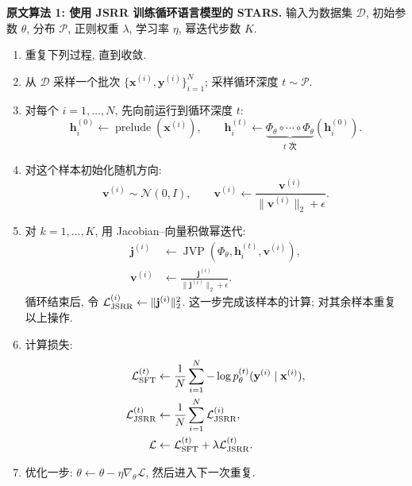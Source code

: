 \noindent\textbf{原文算法 1: 使用 JSRR 训练循环语言模型的 STARS.}\label{stars-alg-1}
输入为数据集 $\mathcal D$, 初始参数 $\theta$, 分布 $\mathcal P$, 正则权重 $\lambda$, 学习率 $\eta$, 幂迭代步数 $K$.
\begin{enumerate}
\item 重复下列过程, 直到收敛.
\item 从 $\mathcal D$ 采样一个批次 $\{\mathbf x^{(i)},\mathbf y^{(i)}\}_{i=1}^N$; 采样循环深度 $t\sim\mathcal P$.
\item 对每个 $i=1,\ldots,N$, 先向前运行到循环深度 $t$:
\[
\mathbf h_i^{(0)}\gets\operatorname{prelude}(\mathbf x^{(i)}),\qquad
\mathbf h_i^{(t)}\gets\underbrace{\Phi_\theta\circ\cdots\circ\Phi_\theta}_{t\text{ 次}}(\mathbf h_i^{(0)}).
\]
\item 对这个样本初始化随机方向:
\[
\mathbf v^{(i)}\sim\mathcal N(0,I),\qquad
\mathbf v^{(i)}\gets\frac{\mathbf v^{(i)}}{\|\mathbf v^{(i)}\|_2+\epsilon}.
\]
\item 对 $k=1,\ldots,K$, 用 Jacobian--向量积做幂迭代:
\begin{align*}
\mathbf j^{(i)}&\gets\operatorname{JVP}(\Phi_\theta,\mathbf h_i^{(t)},\mathbf v^{(i)}),\\
\mathbf v^{(i)}&\gets\frac{\mathbf j^{(i)}}{\|\mathbf j^{(i)}\|_2+\epsilon}.
\end{align*}
循环结束后, 令 $\mathcal L_{\rm JSRR}^{(i)}\gets\|\mathbf j^{(i)}\|_2^2$. 这一步完成该样本的计算; 对其余样本重复以上操作.
\item 计算损失:
\begin{align*}
\mathcal L_{\rm SFT}^{(t)}&\gets\frac1N\sum_{i=1}^N-\log p_\theta^{(t)}(\mathbf y^{(i)}\mid\mathbf x^{(i)}),\\
\mathcal L_{\rm JSRR}^{(t)}&\gets\frac1N\sum_{i=1}^N\mathcal L_{\rm JSRR}^{(i)},\\
\mathcal L&\gets\mathcal L_{\rm SFT}^{(t)}+\lambda\mathcal L_{\rm JSRR}^{(t)}.
\end{align*}
\item 优化一步: $\theta\gets\theta-\eta\nabla_\theta\mathcal L$, 然后进入下一次重复.
\end{enumerate}

